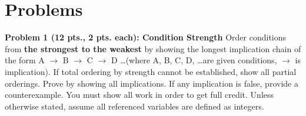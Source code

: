 \documentclass[11pt]{article}
\begin{document}
\noindent{}
\par


\section*{Problems}
\label{sec:Problems}

{\large\textbf{Problem 1 (12 pts., 2 pts. each): Condition Strength}}
\newline
\noindent Order conditions from \textbf{the strongest to the weakest} by showing the longest implication chain of the form A $\rightarrow$ B $\rightarrow$ C $\rightarrow$ D \dots (where A, B, C, D, \dots are given conditions, $\rightarrow$ is implication). If total ordering by strength cannot be established, show all partial orderings. Prove by showing all implications. If any implication is false, provide a counterexample. You must show all work in order to get full credit. Unless otherwise stated, assume all referenced variables are defined as integers.
\end{document}
